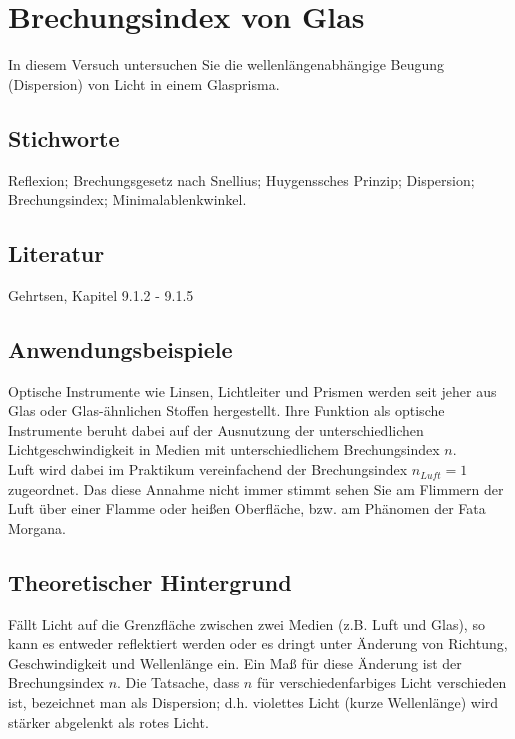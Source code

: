 \chapter{Brechungsindex von Glas}
\label{v:9}

In diesem Versuch untersuchen Sie die wellenlängenabhängige Beugung (Dispersion) von Licht in einem Glasprisma.

\section{Stichworte}

Reflexion; Brechungsgesetz nach Snellius; Huygenssches Prinzip; Dispersion; Brechungsindex; Minimalablenkwinkel.
%
\section{Literatur}

Gehrtsen, Kapitel 9.1.2 - 9.1.5
%
\section{Anwendungsbeispiele}
%
Optische Instrumente wie Linsen, Lichtleiter und Prismen werden seit jeher aus Glas oder Glas-ähnlichen Stoffen hergestellt. Ihre Funktion als optische Instrumente beruht dabei auf der Ausnutzung der unterschiedlichen Lichtgeschwindigkeit in Medien mit unterschiedlichem Brechungsindex $n$.\\
Luft wird dabei im Praktikum vereinfachend der Brechungsindex $n_{Luft} = 1$ zugeordnet. Das diese Annahme nicht immer stimmt sehen Sie am Flimmern der Luft über einer Flamme oder heißen Oberfläche, bzw. am Phänomen der Fata Morgana. 
%
\section{Theoretischer Hintergrund}

Fällt Licht auf die Grenzfläche zwischen zwei Medien (z.B. Luft und Glas), so kann es entweder reflektiert werden oder es dringt unter Änderung von Richtung, Geschwindigkeit und Wellenlänge ein. Ein Maß für diese Änderung ist der Brechungsindex $n$. Die Tatsache, dass $n$ für verschiedenfarbiges Licht verschieden ist, bezeichnet man als Dispersion; d.h. violettes Licht (kurze Wellenlänge) wird stärker abgelenkt als rotes Licht.

